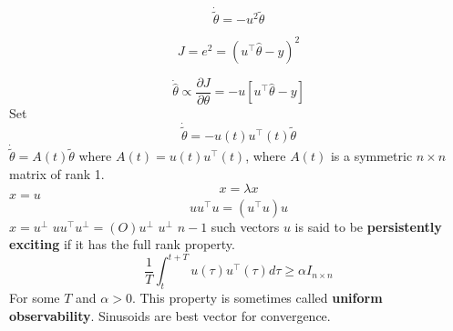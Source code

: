 \begin{equation*}
  \dot{\tilde{\theta}}=-u^{2}\tilde{\theta}
\end{equation*}

\begin{equation*}
  J=e^{2}=(u^{\top}\hat{\theta}-y)^{2}
\end{equation*}

\begin{equation*}
  \dot{\hat{\theta}}\propto\frac{\partial{}J}{\partial{}\theta}=-u[u^{\top}\hat{\theta}-y]
\end{equation*}
Set
\begin{equation*}
  \dot{\tilde{\theta}}=-u(t)u^{\top}(t)\tilde{\theta}
\end{equation*}
$\dot{\tilde{\theta}}=A(t)\tilde{\theta}$ where $A(t)=u(t)u^{\top}(t)$, where $A(t)$ is a symmetric $n\times n$ matrix of rank 1.
\begin{equation*}
  [uu^{\top}]x=\lambda x
\end{equation*}
$x=u$
\begin{equation*}
  uu^{\top}u=(u^{\top}u)u
\end{equation*}
$x=u^{\perp}$ $uu^{\top}u^{\perp}=(O)u^{\perp}$
$u^{\perp}$ $n-1$ such vectors
$u$ is said to be \textbf{persistently exciting} if it has the full rank property.
\begin{equation*}
  \frac{1}{T}\int_{t}^{t+T}u(\tau)u^{\top}(\tau)d\tau\geq\alpha I_{n\times n}
\end{equation*}
For some $T$ and $\alpha>0$.
This property is sometimes called \textbf{uniform observability}.
Sinusoids are best vector for convergence.

